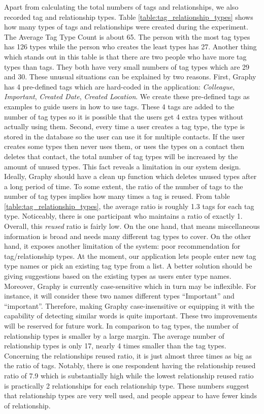Apart from calculating the total numbers of tags and relationships, we also recorded tag and relationship types. Table \ref{table:tag_relationship_types} shows how many types of tags and relationships were created during the experiment. The Average Tag Type Count is about 65. The person with the most tag types has 126 types while the person who creates the least types has 27. Another thing which stands out in this table is that there are two people who have more tag types than tags. They both have very small numbers of tag types which are 29 and 30. These unusual situations can be explained by two reasons. First, Graphy has 4 pre-defined tags which are hard-coded in the application: \textit{Colleague}, \textit{Important}, \textit{Created Date}, \textit{Created Location}. We create these pre-defined tags as examples to guide users in how to use tags. These 4 tags are added to the number of tag types so it is possible that the users get 4 extra types without actually using them. Second, every time a user creates a tag type, the type is stored in the database so the user can use it for multiple contacts. If the user creates some types then never uses them, or uses the types on a contact then deletes that contact, the total number of tag types will be increased by the amount of unused types. This fact reveals a limitation in our system design. Ideally, Graphy should have a clean up function which deletes unused types after a long period of time. To some extent, the ratio of the number of tags to the number of tag types implies how many times a tag is reused. From table \ref{table:tag_relationship_types}, the average ratio is roughly 1.3 tags for each tag type. Noticeably, there is one participant who maintains a ratio of exactly 1. Overall, this \textit{reused} ratio is fairly low. On the one hand, that means miscellaneous information is broad and needs many different tag types to cover. On the other hand, it exposes another limitation of the system: poor recommendation for tag/relationship types. At the moment, our application lets people enter new tag type names or pick an existing tag type from a list. A better solution should be giving suggestions based on the existing types as users enter type names. Moreover, Graphy is currently case-sensitive which in turn may be inflexible. For instance, it will consider these two names different types ``Important'' and ``important''. Therefore, making Graphy case-insensitive or equipping it with the capability of detecting similar words is quite important. These two improvements will be reserved for future work. In comparison to tag types, the number of relationship types is smaller by a large margin. The average number of relationship types is only 17, nearly 4 times smaller than the tag types. Concerning the relationships reused ratio, it is just almost three times as big as the ratio of tags. Notably, there is one respondent having the relationship reused ratio of 7.9 which is substantially high while the lowest relationship reused ratio is practically 2 relationships for each relationship type. These numbers suggest that relationship types are very well used, and people appear to have fewer kinds of relationship.

